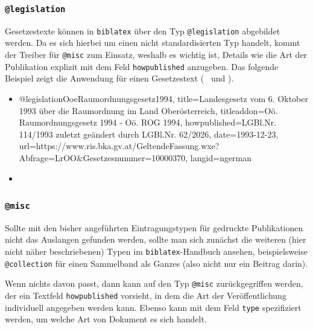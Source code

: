 \subsubsection{\texttt{\bfseries @legislation}}
\label{sec:@legislation}

Gesetzestexte können in \texttt{biblatex} über den Typ \texttt{@legislation}
abgebildet werden. Da es sich hierbei um einen nicht standardisierten Typ
handelt, kommt der Treiber für \texttt{@misc} zum Einsatz, weshalb es wichtig
ist, Details wie die Art der Publikation explizit mit dem Feld
\texttt{howpublished} anzugeben. Das folgende Beispiel zeigt die Anwendung
für einen Gesetzestext (\sa\ \cite{FhStG1993} und \cite{EuRichtlinie2000}).
%
\begin{itemize}
\item[]
\begin{GenericCode}[numbers=none]
@legislation{OoeRaumordnungsgesetz1994,
  title={Landesgesetz vom 6. Oktober 1993 über die Raumordnung im Land Oberösterreich},
  titleaddon={Oö. Raumordnungsgesetz 1994 - Oö. ROG 1994},
  howpublished={LGBl.Nr. 114/1993 zuletzt geändert durch LGBl.Nr. 62/2026},
  date={1993-12-23},
  url={https://www.ris.bka.gv.at/GeltendeFassung.wxe?Abfrage=LrOO&Gesetzesnummer=10000370},
  langid={ngerman}
}
\end{GenericCode}
\item[\cite{OoeRaumordnungsgesetz1994}] 
\end{itemize}
%


\subsubsection{\texttt{\bfseries @misc}}
\label{sec:@misc}

Sollte mit den bisher angeführten Eintragungstypen für gedruckte
Publikationen nicht das Auslangen gefunden werden, sollte man sich zunächst
die weiteren (hier nicht näher beschriebenen) Typen im
\texttt{biblatex}-Handbuch \cite{Kime2026} ansehen, beispielsweise
\texttt{@collection} für einen Sammelband als Ganzes (also nicht nur ein
Beitrag darin).

Wenn nichts davon passt, dann kann auf den Typ \texttt{@misc} zurückgegriffen
werden, der ein Textfeld \texttt{howpublished} vorsieht, in dem die Art der
Veröffentlichung individuell angegeben werden kann. Ebenso kann mit dem Feld
\texttt{type} spezifiziert werden, um welche Art von Dokument es sich handelt.

